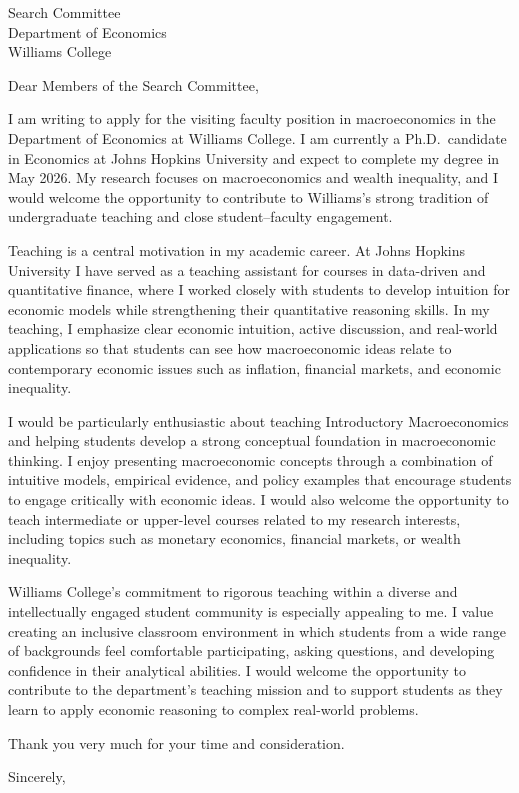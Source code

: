 \documentclass[11pt]{letter}
\begin{document}
\begin{letter}{Search Committee \\
Department of Economics \\
Williams College}

\opening{Dear Members of the Search Committee,}

I am writing to apply for the visiting faculty position in macroeconomics in the Department of Economics at Williams College. I am currently a Ph.D.\ candidate in Economics at Johns Hopkins University and expect to complete my degree in May 2026. My research focuses on macroeconomics and wealth inequality, and I would welcome the opportunity to contribute to Williams’s strong tradition of undergraduate teaching and close student–faculty engagement.

Teaching is a central motivation in my academic career. At Johns Hopkins University I have served as a teaching assistant for courses in data-driven and quantitative finance, where I worked closely with students to develop intuition for economic models while strengthening their quantitative reasoning skills. In my teaching, I emphasize clear economic intuition, active discussion, and real-world applications so that students can see how macroeconomic ideas relate to contemporary economic issues such as inflation, financial markets, and economic inequality.

I would be particularly enthusiastic about teaching Introductory Macroeconomics and helping students develop a strong conceptual foundation in macroeconomic thinking. I enjoy presenting macroeconomic concepts through a combination of intuitive models, empirical evidence, and policy examples that encourage students to engage critically with economic ideas. I would also welcome the opportunity to teach intermediate or upper-level courses related to my research interests, including topics such as monetary economics, financial markets, or wealth inequality.

Williams College’s commitment to rigorous teaching within a diverse and intellectually engaged student community is especially appealing to me. I value creating an inclusive classroom environment in which students from a wide range of backgrounds feel comfortable participating, asking questions, and developing confidence in their analytical abilities. I would welcome the opportunity to contribute to the department’s teaching mission and to support students as they learn to apply economic reasoning to complex real-world problems.

Thank you very much for your time and consideration.

\closing{Sincerely,}

\end{letter}
\end{document}
